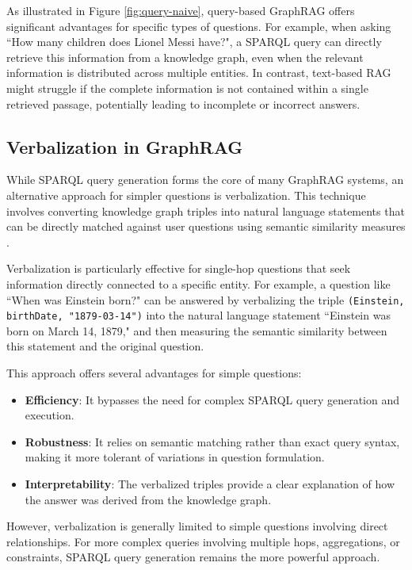 As illustrated in Figure \ref{fig:query-naive}, query-based GraphRAG offers significant advantages for specific types of questions. For example, when asking ``How many children does Lionel Messi have?", a SPARQL query can directly retrieve this information from a knowledge graph, even when the relevant information is distributed across multiple entities. In contrast, text-based RAG might struggle if the complete information is not contained within a single retrieved passage, potentially leading to incomplete or incorrect answers.

\subsection{Verbalization in GraphRAG}
While SPARQL query generation forms the core of many GraphRAG systems, an alternative approach for simpler questions is verbalization. This technique involves converting knowledge graph triples into natural language statements that can be directly matched against user questions using semantic similarity measures \citep{ongris2024frog}.

Verbalization is particularly effective for single-hop questions that seek information directly connected to a specific entity. For example, a question like ``When was Einstein born?" can be answered by verbalizing the triple \texttt{(Einstein, birthDate, "1879-03-14")} into the natural language statement ``Einstein was born on March 14, 1879," and then measuring the semantic similarity between this statement and the original question.

This approach offers several advantages for simple questions:
\begin{itemize}
    \item \textbf{Efficiency}: It bypasses the need for complex SPARQL query generation and execution.
    \item \textbf{Robustness}: It relies on semantic matching rather than exact query syntax, making it more tolerant of variations in question formulation.
    \item \textbf{Interpretability}: The verbalized triples provide a clear explanation of how the answer was derived from the knowledge graph.
\end{itemize}

However, verbalization is generally limited to simple questions involving direct relationships. For more complex queries involving multiple hops, aggregations, or constraints, SPARQL query generation remains the more powerful approach.

